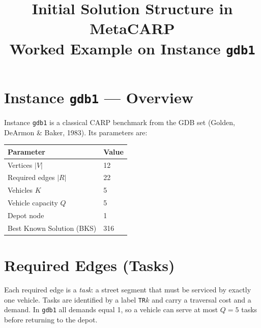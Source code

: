 \documentclass[12pt, a4paper]{article}
\title{Initial Solution Structure in MetaCARP\\
       \large Worked Example on Instance \texttt{gdb1}}
\author{}
\date{}
\begin{document}
\maketitle
\tableofcontents
\newpage

\section{Instance \texttt{gdb1} — Overview}

Instance \texttt{gdb1} is a classical CARP benchmark from the GDB set
(Golden, DeArmon \& Baker, 1983). Its parameters are:

\begin{center}
\renewcommand{\arraystretch}{1.3}
\begin{tabular}{ll}
\toprule
\textbf{Parameter} & \textbf{Value} \\
\midrule
Vertices $|V|$          & 12 \\
Required edges $|R|$    & 22 \\
Vehicles $K$            & 5  \\
Vehicle capacity $Q$    & 5  \\
Depot node              & 1  \\
Best Known Solution (BKS) & 316 \\
\bottomrule
\end{tabular}
\end{center}

\section{Required Edges (Tasks)}

Each required edge is a \emph{task}: a street segment that must be
serviced by exactly one vehicle. Tasks are identified by a label
\texttt{TR}$k$ and carry a traversal cost and a demand.
In \texttt{gdb1} all demands equal 1, so a vehicle can serve at most
$Q = 5$ tasks before returning to the depot.
\end{document}
